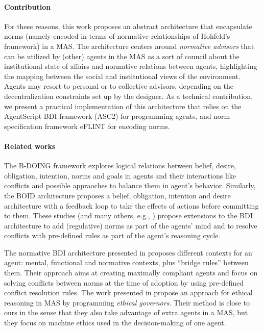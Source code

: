 \paragraph{Contribution}
For these reasons, this work proposes an abstract architecture that encapsulate norms (namely encoded in terms of normative relationships of Hohfeld's framework) in a MAS. The architecture centers around \textit{normative advisors} that can be utilized by (other) agents in the MAS as a sort of council about the institutional state of affairs and normative relations between agents, highlighting the mapping between the social and institutional views of the environment. Agents may resort to personal or to collective advisors, depending on the decentralization constraints set up by the designer.   
%
As a technical contribution, we present a practical implementation of this architecture that relies on the AgentScript BDI framework (ASC2) \cite{MohajeriParizi2020} for programming agents, and norm specification framework eFLINT \cite{VanBinsbergen2020EFLINT:Specifications} for encoding norms. 
%



\paragraph{Related works}
The B-DOING framework \cite{Dignum2002MotivationalNorms} explores logical relations between belief, desire, obligation, intention, norms and goals in agents and their interactions like conflicts and possible appraoches to balance them in agent's behavior. Similarly, the BOID architecture \cite{Broersen01theboid,Pandzic2022BOID} proposes a belief, obligation, intention and desire architecture with a feedback loop to take the effects of actions before committing to them. These studies (and many others, e.g., \cite{Deljoo2018APlaces,Tufis2017}) propose extensions to the BDI architecture to add (regulative) norms as part of the agents' mind and to resolve conflicts with pre-defined rules as part of the agent's reasoning cycle.


The normative BDI architecture presented in \cite{Criado2010TowardsCompliance} proposes different contexts for an agent: mental, functional and normative contexts, plus ``bridge rules'' between them. Their approach aims at creating maximally compliant agents and focus on solving conflicts between norms at the time of adoption by using pre-defined conflict resolution rules. The work presented in \cite{Cardoso2021ImplementingBDI} propose an approach for ethical reasoning in MAS by programming \textit{ethical governors}. Their method is close to ours in the sense that they also take advantage of extra agents in a MAS, but they focus on machine ethics used in the decision-making of one agent.


